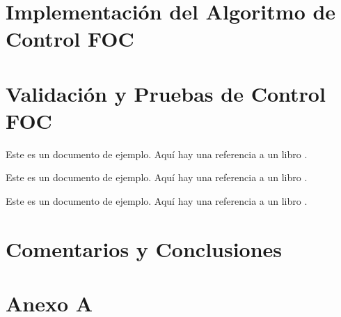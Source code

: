 \documentclass[11pt]{report}
\begin{document}
\newpage
\chapter{Implementación del Algoritmo de Control FOC}

\newpage
\chapter{Validación y Pruebas de Control FOC}
Este es un documento de ejemplo. Aquí hay una referencia a un libro \cite[p 200]{power_conv_00}.

Este es un documento de ejemplo. Aquí hay una referencia a un libro \cite[p 200]{AN2757_00}.

Este es un documento de ejemplo. Aquí hay una referencia a un libro \cite{odrive_SVM}.

\newpage
\chapter*{Comentarios y Conclusiones}

\newpage
{}
\printbibliography

\newpage
{}

\chapter*{Anexo A}
\end{document}

